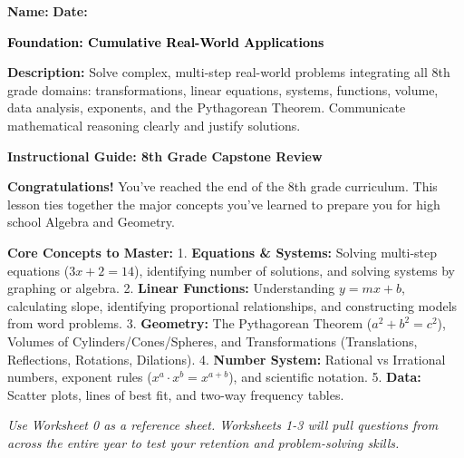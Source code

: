 \documentclass[12pt, letterpaper, fleqn]{article}
\begin{document}
\textbf{Name:} \underline{\hspace{5cm}}
\hfill
\textbf{Date:} \underline{\hspace{3cm}}\\

\begin{tcolorbox}[colback=customteal!20]
    \large\textcolor{black}{\textbf{Foundation: Cumulative Real-World Applications}}
\end{tcolorbox}

\vspace{3mm}

\noindent
\textbf{Description:} Solve complex, multi-step real-world problems integrating all 8th grade domains: transformations, linear equations, systems, functions, volume, data analysis, exponents, and the Pythagorean Theorem. Communicate mathematical reasoning clearly and justify solutions.

\vspace{4mm}


\begin{tcolorbox}[colback=white, colframe=black!25, boxrule=0.6pt, arc=4mm, left=6mm, right=6mm, top=5mm, bottom=5mm]
\textbf{Instructional Guide: 8th Grade Capstone Review}

\medskip
\textbf{Congratulations!} You've reached the end of the 8th grade curriculum. This lesson ties together the major concepts you've learned to prepare you for high school Algebra and Geometry.

\textbf{Core Concepts to Master:}
1. \textbf{Equations & Systems:} Solving multi-step equations ($3x+2=14$), identifying number of solutions, and solving systems by graphing or algebra.
2. \textbf{Linear Functions:} Understanding $y=mx+b$, calculating slope, identifying proportional relationships, and constructing models from word problems.
3. \textbf{Geometry:} The Pythagorean Theorem ($a^2+b^2=c^2$), Volumes of Cylinders/Cones/Spheres, and Transformations (Translations, Reflections, Rotations, Dilations).
4. \textbf{Number System:} Rational vs Irrational numbers, exponent rules ($x^a \cdot x^b = x^{a+b}$), and scientific notation.
5. \textbf{Data:} Scatter plots, lines of best fit, and two-way frequency tables.

\vspace{2mm}
\textit{Use Worksheet 0 as a reference sheet. Worksheets 1-3 will pull questions from across the entire year to test your retention and problem-solving skills.}
\end{tcolorbox}
\end{document}
